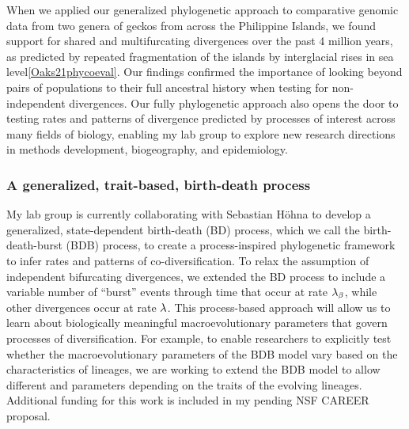 When we applied our generalized phylogenetic approach to comparative genomic data
from two genera of geckos from across the Philippine Islands, we found support
for shared and multifurcating divergences over the past 4 million years,
as predicted by repeated fragmentation of the islands by interglacial rises
in sea
level\cref{Oaks21phycoeval}.
Our findings confirmed the importance of looking beyond pairs of populations to
their full ancestral history when testing for non-independent divergences.
Our fully phylogenetic approach also opens the door to testing rates and
patterns of divergence predicted by processes of interest across many fields of
biology,
enabling my lab group to explore new research directions in methods
development, biogeography, and epidemiology.


\subsubsection*{A generalized, trait-based, birth-death process}
My lab group is currently collaborating with Sebastian H\"ohna to develop a
generalized, state-dependent birth-death (BD) process, which we call the
birth-death-burst (BDB) process, to create a process-inspired
phylogenetic framework to infer rates and patterns of co-diversification.
To relax the assumption of independent bifurcating divergences, we extended the
BD process to include a variable number of ``burst'' events through time that
occur at rate $\lambda_{\beta}$, while other divergences occur
at rate $\lambda$.
This process-based approach will allow us to learn about biologically
meaningful macroevolutionary parameters that govern processes of
diversification.
For example, to enable researchers to explicitly test whether the
macroevolutionary parameters of the BDB model vary based on the characteristics
of lineages, we are working to extend the BDB model to allow different
\speciationrate and \burstrate parameters depending on the traits of the
evolving lineages. 
Additional funding for this work is included in my pending NSF CAREER
proposal.


